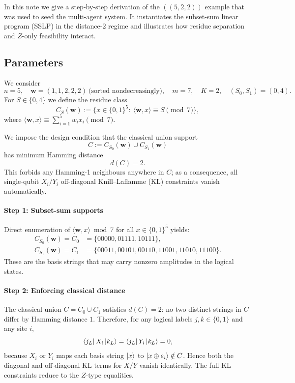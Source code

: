 \documentclass[pdflatex,sn-nature]{sn-jnl}%
\theoremstyle{thmstyleone}%
\theoremstyle{thmstyletwo}%
\theoremstyle{thmstylethree}%
\begin{document}
\begin{appendices}
In this note we give a step-by-step derivation of the $((5,2,2))$ example that was used to seed the multi-agent system. It instantiates the subset-sum linear program (SSLP) in the distance-2 regime and illustrates how residue separation and $Z$-only feasibility interact.

\subsection{Parameters}

We consider
\[
    n=5,\quad \mathbf w=(1,1,2,2,2)\ \text{(sorted nondecreasingly)},\quad
    m=7,\quad K=2,\quad (S_0,S_1)=(0,4).
\]
For $S\in\{0,4\}$ we define the residue class
\[
    C_{S}(\mathbf w):=\{x\in\{0,1\}^5:\ \langle\mathbf w,x\rangle\equiv S \pmod 7\},
\]
where
$\langle\mathbf w,x\rangle\equiv \sum_{i=1}^5 w_i x_i \pmod 7$.

We impose the design condition that the classical union support
\[
    C:=C_{S_0}(\mathbf w)\cup C_{S_1}(\mathbf w)
\]
has minimum Hamming distance
\[
    d(C)=2.
\]
This forbids any Hamming-1 neighbours anywhere in $C$; as a consequence, all single-qubit $X_i/Y_i$ off-diagonal Knill--Laflamme (KL) constraints vanish automatically.

\paragraph{Step 1: Subset-sum supports}

Direct enumeration of $\langle\mathbf w,x\rangle\bmod 7$ for all $x\in\{0,1\}^5$ yields:
\[
    \begin{aligned}
        C_{S_0}(\mathbf w)=C_0 & =\{00000, 01111, 10111\},\\
        C_{S_1}(\mathbf w)=C_1 & =\{00011, 00101, 00110, 11001, 11010, 11100\}.
    \end{aligned}
\]
These are the basis strings that may carry nonzero amplitudes in the logical states.

\paragraph{Step 2: Enforcing classical distance}

The classical union $C=C_0\cup C_1$ satisfies $d(C)=2$: no two distinct strings in $C$ differ by Hamming distance $1$. Therefore, for any logical labels $j,k\in\{0,1\}$ and any site $i$,
\[
    \bra{j_L}X_i\ket{k_L}=\bra{j_L}Y_i\ket{k_L}=0,
\]
because $X_i$ or $Y_i$ maps each basis string $\ket{x}$ to $\ket{x\oplus e_i}\notin C$. Hence both the diagonal and off-diagonal KL terms for $X/Y$ vanish identically. The full KL constraints reduce to the $Z$-type equalities.


\end{appendices}
\end{document}
